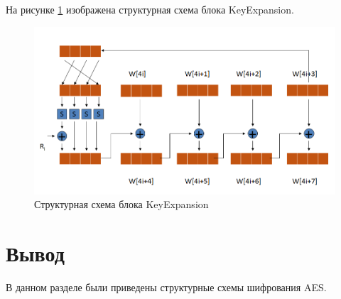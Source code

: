 На рисунке \ref{fig:des7} изображена структурная схема блока KeyExpansion.

\begin{figure}[H]
	\centering
	\includegraphics[width=0.7\linewidth]{img/aes_keys}
	\caption{Структурная схема блока KeyExpansion}
	\label{fig:des7}
\end{figure}

\section*{Вывод}
В данном разделе были приведены структурные схемы шифрования AES.


